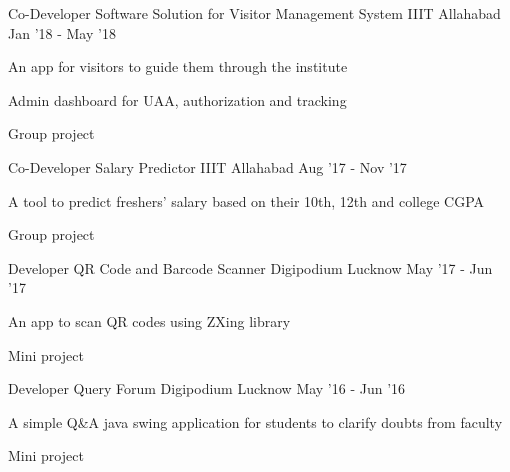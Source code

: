 

\begin{cventries}

  \cventry
    {Co-Developer} %
    {Software Solution for Visitor Management System} %
    {IIIT Allahabad} %
    {Jan '18 - May '18} %
    {
      \begin{cvitems} %
        \item {An app for visitors to guide them through the institute}
        \item {Admin dashboard for UAA, authorization and tracking}
        \item {Group project}
      \end{cvitems}
    }

  \cventry
    {Co-Developer} %
    {Salary Predictor} %
    {IIIT Allahabad} %
    {Aug '17 - Nov '17} %
    {
      \begin{cvitems} %
        \item {A tool to predict freshers' salary based on their 10th, 12th and college CGPA}
        \item {Group project}
      \end{cvitems}
    }

\cventry
    {Developer} %
    {QR Code and Barcode Scanner} %
    {Digipodium Lucknow} %
    {May '17 - Jun '17} %
    {
      \begin{cvitems} %
        \item {An app to scan QR codes using ZXing library}
        \item {Mini project}
      \end{cvitems}
    }

\cventry
    {Developer} %
    {Query Forum} %
    {Digipodium Lucknow} %
    {May '16 - Jun '16} %
    {
      \begin{cvitems} %
        \item {A simple Q\&A java swing application for students to clarify doubts from faculty}
        \item {Mini project}
      \end{cvitems}
    }

\end{cventries}